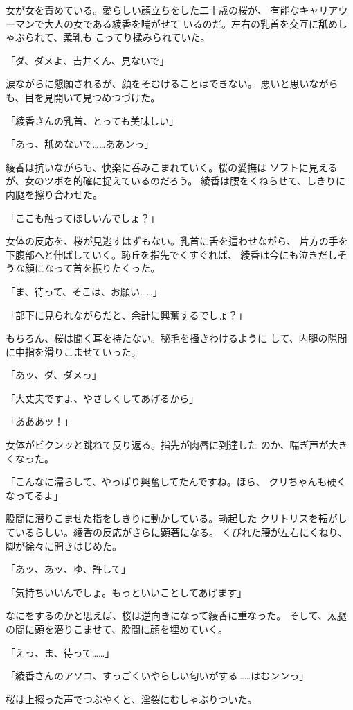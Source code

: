 ﻿\documentclass[
    book,tate,
    line_length=30zw,
    jafontsize=12pt,
    paper=b5j,
    landscape,
    ]{jlreq}
\begin{document}
女が女を責めている。愛らしい顔立ちをした二十歳の桜が、
有能なキャリアウーマンで大人の女である綾香を喘がせて
いるのだ。左右の乳首を交互に舐めしゃぶられて、柔乳も
こってり揉みられていた。

「ダ、ダメよ、吉井くん、見ないで」

涙ながらに懇願されるが、顔をそむけることはできない。
悪いと思いながらも、目を見開いて見つめつづけた。

「綾香さんの乳首、とっても美味しい」

「あっ、舐めないで……ああンっ」

綾香は抗いながらも、快楽に呑みこまれていく。桜の愛撫は
ソフトに見えるが、女のツボを的確に捉えているのだろう。
綾香は腰をくねらせて、しきりに内腿を擦り合わせた。

「ここも触ってほしいんでしょ？」

女体の反応を、桜が見逃すはずもない。乳首に舌を這わせながら、
片方の手を下腹部へと伸ばしていく。恥丘を指先でくすぐれば、
綾香は今にも泣きだしそうな顔になって首を振りたくった。

「ま、待って、そこは、お願い……」

「部下に見られながらだと、余計に興奮するでしょ？」

もちろん、桜は聞く耳を持たない。秘毛を掻きわけるように
して、内腿の隙間に中指を滑りこませていった。

「あッ、ダ、ダメっ」

「大丈夫ですよ、やさしくしてあげるから」

「あああッ！」

女体がビクンッと跳ねて反り返る。指先が肉唇に到達した
のか、喘ぎ声が大きくなった。

「こんなに濡らして、やっぱり興奮してたんですね。ほら、
クリちゃんも硬くなってるよ」

股間に潜りこませた指をしきりに動かしている。勃起した
クリトリスを転がしているらしい。綾香の反応がさらに顕著になる。
くびれた腰が左右にくねり、脚が徐々に開きはじめた。

「あッ、あッ、ゆ、許して」

「気持ちいいんでしょ。もっといいことしてあげます」

なにをするのかと思えば、桜は逆向きになって綾香に重なった。
そして、太腿の間に頭を潜りこませて、股間に顔を埋めていく。

「えっ、ま、待って……」

「綾香さんのアソコ、すっごくいやらしい匂いがする……はむンンっ」

桜は上擦った声でつぶやくと、淫裂にむしゃぶりついた。
\end{document}
